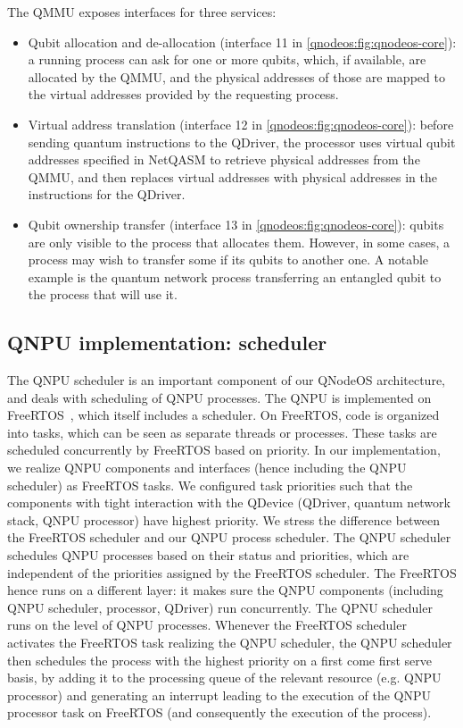 The \ac{QMMU} exposes interfaces for three services:
%
\begin{itemize}
\item Qubit allocation and de-allocation (interface 11 in \cref{qnodeos:fig:qnodeos-core}): a running process can ask for one or more qubits, which, if available, are allocated by the \ac{QMMU}, and the physical addresses of those are mapped to the virtual addresses provided by the requesting process.
\item Virtual address translation (interface 12 in \cref{qnodeos:fig:qnodeos-core}): before sending quantum instructions to the \ac{QDriver}, the processor uses virtual qubit addresses specified in \ac{NetQASM} to retrieve physical addresses from the \ac{QMMU}, and then replaces virtual addresses with physical addresses in the instructions for the \ac{QDriver}.
\item Qubit ownership transfer (interface 13 in \cref{qnodeos:fig:qnodeos-core}): qubits are only visible to the process that allocates them. However, in some cases, a process may wish to transfer some if its qubits to another one. A notable example is the quantum network process transferring an entangled qubit to the process that will use it.
\end{itemize}

\subsection{QNPU implementation: scheduler}
\label{qnodeos:sec:qnpu_impl_scheduler}
The \ac{QNPU} scheduler is an important component of our \ac{QNodeOS} architecture, and deals with scheduling of QNPU processes. The QNPU is implemented on FreeRTOS~\cite{freertos}, which itself includes a scheduler. On FreeRTOS, code is organized into tasks, which can be seen as separate threads or processes. These tasks are scheduled concurrently by FreeRTOS based on priority. In our implementation, we realize QNPU components and interfaces (hence including the QNPU scheduler) as FreeRTOS tasks. We configured task priorities such that the components with tight interaction with the QDevice (\ac{QDriver}, quantum network stack, QNPU processor) have highest priority.
We stress the difference between the FreeRTOS scheduler and our QNPU process scheduler. 
The QNPU scheduler schedules QNPU processes based on their status and priorities, which are independent of the priorities assigned by the FreeRTOS scheduler.
The FreeRTOS hence runs on a different layer: it makes sure the QNPU components (including QNPU scheduler, processor, \ac{QDriver}) run concurrently. The QPNU scheduler runs on the level of QNPU processes. Whenever the FreeRTOS scheduler activates the FreeRTOS task realizing the QNPU scheduler, the QNPU scheduler then schedules the process with the highest priority on a first come first serve basis, by adding it to the processing queue of the relevant resource (e.g. QNPU processor) and generating an interrupt leading to the execution of the QNPU processor task on FreeRTOS (and consequently the execution of the process).


